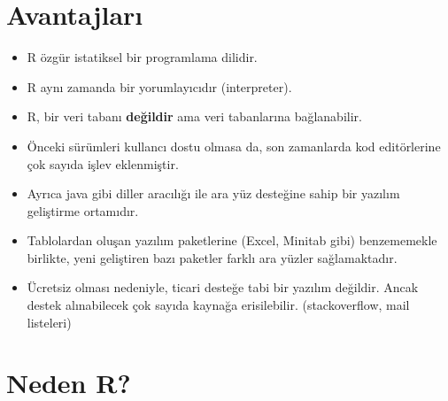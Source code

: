 \documentclass[
  oneside]{book}
\begin{document}
\hypertarget{avantajlarux131}{%
\section{Avantajları}\label{avantajlarux131}}

\begin{itemize}
\item
  R özgür istatiksel bir programlama dilidir.
\item
  R aynı zamanda bir yorumlayıcıdır (interpreter).
\item
  R, bir veri tabanı \textbf{değildir} ama veri tabanlarına bağlanabilir.
\item
  Önceki sürümleri kullancı dostu olmasa da, son zamanlarda kod editörlerine çok sayıda işlev eklenmiştir.
\item
  Ayrıca java gibi diller aracılığı ile ara yüz desteğine sahip bir yazılım geliştirme ortamıdır.
\item
  Tablolardan oluşan yazılım paketlerine (Excel, Minitab gibi) benzememekle birlikte, yeni geliştiren bazı paketler farklı ara yüzler sağlamaktadır.
\item
  Ücretsiz olması nedeniyle, ticari desteğe tabi bir yazılım değildir. Ancak destek alınabilecek çok sayıda kaynağa erisilebilir. (stackoverflow, mail listeleri)
\end{itemize}

\hypertarget{neden-r}{%
\section{Neden R?}\label{neden-r}}
\end{document}
